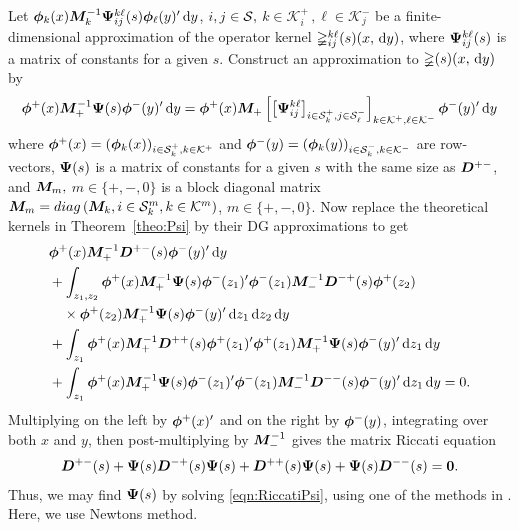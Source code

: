 Let \(\boldsymbol\phi_k(x){\boldsymbol M}_k^{-1}\boldsymbol \Psi_{ij}^{k\ell}(s)\boldsymbol\phi_\ell(y)'{}\, \mathrm{d} y\), \(i,j\in\mathcal{S},\) \(k\in\mathcal K_i^+\,, \ell\in\mathcal K_j^-\) be a finite-dimensional approximation of the operator kernel \(\mathbb\Psi_{ij}^{k\ell}(s)(x,\, \mathrm{d} y)\), where \(\boldsymbol \Psi_{ij}^{k\ell}(s)\) is a matrix of constants for a given \(s\). Construct an approximation to \(\mathbb\Psi(s)(x,\, \mathrm{d} y)\) by 
\[\boldsymbol\phi^+(x){\boldsymbol M}_+^{-1}\boldsymbol \Psi(s)\boldsymbol\phi^-(y)'{}\, \mathrm{d} y = \boldsymbol \phi^+(x)\boldsymbol M_+ \left[\left[\boldsymbol \Psi_{ij}^{k\ell}\right]_{i\in\mathcal{S}_k^+,j\in\mathcal{S}_\ell^-}\right]_{k\in\mathcal K^+,\ell\in\mathcal K^-}\boldsymbol \phi^-(y)'\, \mathrm{d} y\]%
where \(\boldsymbol\phi^+(x) = (\boldsymbol\phi_k(x))_{i\in\mathcal{S}_k^+,k\in\mathcal K^+}\) and \(\boldsymbol\phi^-(y) = (\boldsymbol\phi_k(y))_{i\in\mathcal{S}_k^-,k\in\mathcal K^-}\) are row-vectors, \(\boldsymbol \Psi(s)\) is a matrix of constants for a given \(s\) with the same size as \(\boldsymbol D^{+-}\), and \({\boldsymbol M}_m,\) \(m\in\{+,-,0\}\) is a block diagonal matrix \({\boldsymbol M}_m = diag\left(  \boldsymbol M_k, {i\in\mathcal{S}_k^m}, {k\in\mathcal K^m}\right)\), \(m\in\{+,-,0\}\). Now replace the theoretical kernels in Theorem~\ref{theo:Psi} by their DG approximations to get 
\begin{align*}
&\boldsymbol\phi^+(x){\boldsymbol M}_+^{-1}  \boldsymbol D^{+-}(s)\boldsymbol\phi^-(y)'{}\, \mathrm{d} y
\\&{}+ \int_{z_1,z_2}\boldsymbol\phi^+(x){\boldsymbol M}_+^{-1}\boldsymbol \Psi(s)\boldsymbol\phi^-(z_1)'{}\boldsymbol\phi^-(z_1) {\boldsymbol M}_-^{-1}  \boldsymbol D^{-+}(s)\boldsymbol\phi^+(z_2)
\\&{}\quad\times\boldsymbol\phi^+(z_2){\boldsymbol M}_+^{-1}\boldsymbol \Psi(s)\boldsymbol\phi^-(y)'{}\, \mathrm{d} z_1\, \mathrm{d} z_2\, \mathrm{d} y
\\&{}+ \int_{z_1}\boldsymbol\phi^+(x){\boldsymbol M}_+^{-1}  \boldsymbol D^{++}(s)\boldsymbol\phi^+(z_1)'{}\boldsymbol\phi^+(z_1) {\boldsymbol M}_+^{-1}\boldsymbol \Psi(s)\boldsymbol\phi^-(y)'{}\, \mathrm{d} z_1\, \mathrm{d} y
\\&{}+ \int_{z_1}\boldsymbol\phi^+(x){\boldsymbol M}_+^{-1}\boldsymbol \Psi(s)\boldsymbol\phi^-(z_1)'{}\boldsymbol\phi^-(z_1){\boldsymbol M}_-^{-1}  \boldsymbol D^{--}(s)\boldsymbol\phi^-(y)'{}\, \mathrm{d} z_1\, \mathrm{d} y
= 0.
\end{align*}
Multiplying on the left by \(\boldsymbol\phi^+(x)'{}\) and on the right by \(\boldsymbol\phi^-(y)\), integrating over both \(x\) and \(y\), then post-multiplying by \({\boldsymbol M}^{-1}_-\) gives the matrix Riccati equation
\begin{align}\label{eqn:RiccatiPsi}
    \boldsymbol D^{+-}(s)
+ \boldsymbol \Psi(s)   \boldsymbol D^{-+}(s)\boldsymbol \Psi(s)
+   \boldsymbol D^{++}(s)\boldsymbol \Psi(s)
+ \boldsymbol \Psi(s)  \boldsymbol D^{--}(s)
= \boldsymbol 0.
\end{align}
Thus, we may find \(\boldsymbol \Psi(s)\) by solving \eqref{eqn:RiccatiPsi}, using one of the methods in \citep{bot08}. Here, we use Newtons method. 

